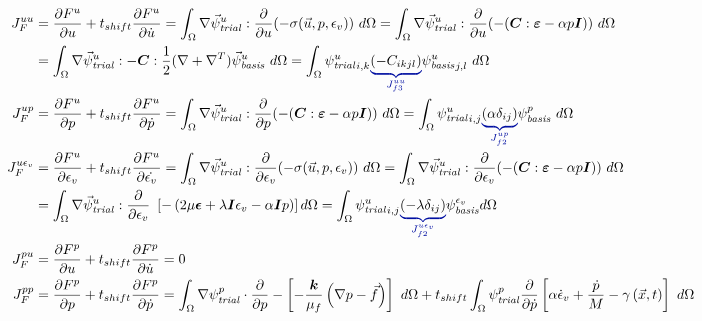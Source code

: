 \begin{align}
%
J_F^{uu} &= \frac{\partial F^u}{\partial u} + t_{shift} \frac{\partial F^u}{\partial \dot{u}} = \int_{\Omega} \nabla \trialvec[u] : \frac{\partial}{\partial u} (- \sigma(\vec{u},p,\epsilon_{v})) \
d\Omega = \int_{\Omega} \nabla \trialvec[u] : \frac{\partial}{\partial u} (-(\tensor{C}:\tensor{\varepsilon} -\alpha p \tensor{I})) \ d\Omega \\
&= \int_{\Omega} \nabla \trialvec[u] : -\tensor{C}: \frac{1}{2} (\nabla + \nabla^T) \basisvec[u] \ d\Omega = \int_{\Omega} \trialscalar[u]_{i,k}
\eqnannotate{\left(-C_{ikjl}\right)}{J_{f3}^{uu}} \basisscalar[u]_{j,l} \ d\Omega \\
%
J_F^{up} &= \frac{\partial F^u}{\partial p} + t_{shift} \frac{\partial F^u}{\partial \dot{p}} = \int_{\Omega} \nabla \trialvec[u] : \frac{\partial}{\partial p}(-(\tensor{C}:\tensor{\varepsilon} -\alpha p \tensor{I})) \ d\Omega =
\int_{\Omega} \trialscalar[u]_{i,j} \eqnannotate{\left(\alpha \delta_{ij}\right)}{J_{f2}^{up}} \basisscalar[p] \ d\Omega \\
%
J_F^{u \epsilon_{v}} &= \frac{\partial F^u}{\partial \epsilon_{v}} + t_{shift} \frac{\partial F^u}{\partial \dot{\epsilon_{v}}} = \int_{\Omega} \nabla \trialvec[u] : \frac{\partial}{\partial \epsilon_{v}}
(-\sigma(\vec{u},p,\epsilon_{v})) \ d\Omega = \int_{\Omega} \nabla \trialvec[u] :
\frac{\partial}{\partial \epsilon_{v}} (-(\tensor{C}:\tensor{\varepsilon} -\alpha p \tensor{I})) \ d\Omega \\
&= \int_{\Omega} \nabla \trialvec[u] : \frac{\partial}{\partial \epsilon_{v}} \
\left[-\left(2 \mu \tensor{\epsilon} + \lambda \tensor{I} \epsilon_{v} - \alpha \tensor{I} p \right) \right] d\Omega =
\int_{\Omega} \trialscalar[u]_{i,j} \eqnannotate{\left(-\lambda \delta_{ij} \right)}{J_{f2}^{u \epsilon_{v}}} \basisscalar[\epsilon_{v}] d\Omega  \\
%
%
J_F^{pu} &= \frac{\partial F^p}{\partial u} + t_{shift} \frac{\partial F^p}{\partial \dot{u}} = 0 \\
%
J_F^{pp} &= \frac{\partial F^p}{\partial p} + t_{shift} \frac{\partial F^p}{\partial \dot{p}} =
\int_{\Omega} \nabla \trialscalar[p] \cdot \frac{\partial}{\partial p} -\left[-\frac{\tensor{k}}{\mu_{f}} \left(\nabla p - \vec{f} \right) \right] \ d\Omega  +
t_{shift}\int_{\Omega} \trialscalar[p] \frac{\partial}{\partial \dot{p}} \left[\alpha\dot{\epsilon}_{v} + \frac{\dot{p}}{M} - \gamma\left(\vec{x},t\right)\right] \ d\Omega \\

\end{align}
